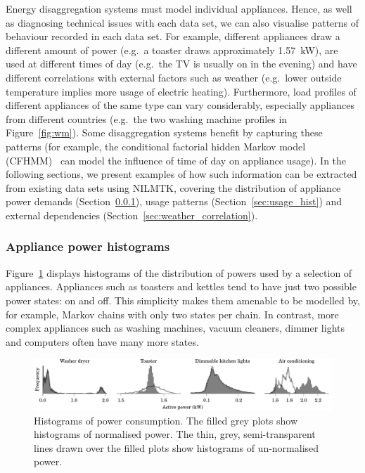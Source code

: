 \documentclass{sig-alternate}
\newcommand{\secref}[1]{Section~\ref{#1}}
\begin{document}
\noindent
Energy disaggregation systems must model individual appliances.  Hence, as well as diagnosing technical issues with each data set, we can also visualise patterns of behaviour recorded in each data set. For example, different appliances draw a different amount of power (e.g.\ a toaster draws approximately 1.57~kW), are used at different times of day (e.g.\ the TV is usually on in the evening) and have different correlations with external factors such as weather (e.g.\ lower outside temperature implies more usage of electric heating). Furthermore, load profiles of different appliances of the same type can vary considerably, especially appliances from different countries (e.g.\ the two washing machine profiles in Figure~\ref{fig:wm}). Some disaggregation systems benefit by capturing these patterns (for example, the conditional factorial hidden Markov model (CFHMM)~\cite{kim_2011} can model the influence of time of day on appliance usage). In the following sections, we present examples of how such information can be extracted from existing data sets using NILMTK, covering the distribution of appliance power demands (\secref{sec:power_hist}), usage patterns (\secref{sec:usage_hist}) and external dependencies (\secref{sec:weather_correlation}).

\subsubsection{Appliance power histograms}
\label{sec:power_hist}

\noindent
Figure~\ref{fig:power_histograms} displays histograms of the
distribution of powers used by a selection of appliances.  Appliances
such as toasters and kettles tend to have just two possible power states:
on and off.  This simplicity makes them amenable to be modelled by,
for example, Markov chains with only two states per chain.  In contrast, more complex appliances
such as washing machines, vacuum cleaners, dimmer lights and computers often
have many more states.

\begin{figure}[!t]
  \centering
  \includegraphics{figures/power_histograms.pdf} 
  \caption{Histograms of power consumption. The filled grey plots show
    histograms of normalised power.  The thin, grey,
    semi-transparent lines drawn over the filled plots show histograms
    of un-normalised power.}
  \label{fig:power_histograms} 
\end{figure}
\end{document}

